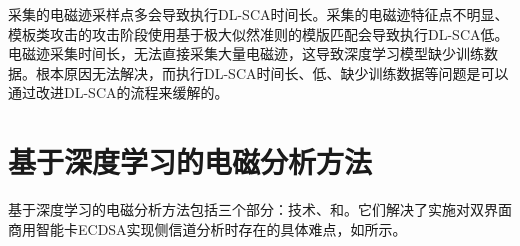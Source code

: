 {	{\color{\xchange}
		
	采集的电磁迹采样点多会导致执行DL-SCA时间长。采集的电磁迹特征点不明显、模板类攻击的攻击阶段使用基于极大似然准则的模版匹配会导致执行DL-SCA\zyx 低。电磁迹采集时间长，无法直接采集大量电磁迹，这导致深度学习模型缺少训练数据。根本原因无法解决，而执行DL-SCA时间长、\zyx 低、缺少训练数据等问题是可以通过改进DL-SCA的流程来缓解的。%
	

	\section{基于深度学习的电磁分析方法}\label{sec:solution}
	{\color{\xchange}
		
		基于深度学习的电磁分析方法包括三个部分：\yuchuli 技术、\shujuzengqiang 和\jiashejianyanguji。它们解决了实施对双界面商用智能卡ECDSA实现侧信道分析时存在的具体难点，如所示。
		
}}}
